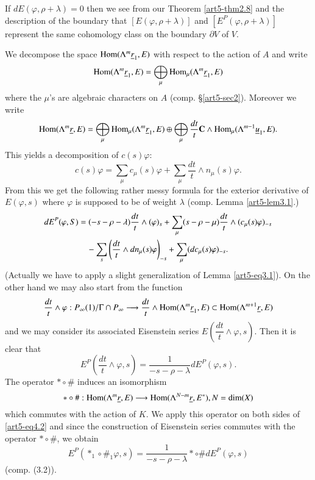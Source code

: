 If $d E (\varphi, \rho + \lambda) = 0$ then we see from our Theorem \ref{art5-thm2.8} and the description of the boundary that $[E(\varphi, \rho + \lambda)]$ and $[E^P (\varphi, \rho +\lambda)]$ represent the same cohomology class on the boundary $\partial V$ of $V$.

We decompose the space $\operatorname{Hom} (\Lambda^m \underline{r}_1, E)$ with respect to the action of $A$ and write
$$
\operatorname{Hom} (\Lambda^m \underline{r}_1, E) = \bigoplus_\mu \operatorname{Hom}_\mu (\Lambda^m \underline{r}_1, E)
$$\pageoriginale
where the $\mu$'s are algebraic characters on $A$ (comp. \S \ref{art5-sec2}). Moreover we write
$$
\operatorname{Hom} (\Lambda^m \underline{r}, E) =\bigoplus_\mu \operatorname{Hom}_\mu (\Lambda^m \underline{r}_1, E) \oplus \bigoplus_\mu \dfrac{dt}{t} \mathbf{C} \wedge \operatorname{Hom}_\mu (\Lambda^{m-1} \underline{u}_{1}, E).
$$
This yields a decomposition of $c (s) \varphi$:
$$
c (s) \varphi = \sum\limits_\mu c_\mu (s) \varphi + \sum\limits_\mu \frac{dt}{t} \wedge n_\mu (s) \varphi.
$$
From this we get the following rather messy formula for the exterior derivative of $E (\varphi, s)$ where $\varphi$ is supposed to be of weight $\lambda$ (comp. Lemma \ref{art5-lem3.1}.)
\setcounter{equation}{0}
\begin{align}
dE^P (\varphi, S) & = (-s - \rho - \lambda) \frac{dt}{t} \wedge (\varphi)_s + \sum\limits_\mu (s - \rho - \mu) \frac{dt}{t} \wedge (c_\mu (s) \varphi)_{-s} \notag\\
& \quad - \sum\limits_s \left(\frac{dt}{t} \wedge dn_\mu (s) \varphi  \right)_{-s} + \sum\limits_\mu (dc_\mu (s) \varphi)_{-s}.   \label{art5-eq4.1}
\end{align}
(Actually we have to apply a slight generalization of Lemma \ref{art5-eq3.1}). On the other hand we may also start from the function
$$
\frac{dt}{t} \wedge \varphi : P_\infty (1) / \Gamma \cap P_\infty \longrightarrow \dfrac{dt}{t} \wedge \operatorname{Hom} (\Lambda^m \underline{r}_1, E) \subset \operatorname{Hom} (\Lambda^{m+1} \underline{r}, E)
$$
and we may consider its associated Eisenstein series $E \left(\dfrac{dt}{t} \wedge \varphi, s \right)$. Then it is clear that 
\begin{equation}
E^P \left(\frac{dt}{t}  \wedge \varphi, s \right) =\frac{1}{-s-\rho - \lambda} dE^P(\varphi, s). \label{art5-eq4.2}
\end{equation}
The operator $\ast \circ \#$ induces an isomorphism
$$
\ast \circ \# : \operatorname{Hom} (\Lambda^m \underline{r}, E) \longrightarrow \operatorname{Hom} (\Lambda^{N-m} \underline{r}, E^\ast), N = \dim (X)
$$
which commutes with the action of $K$. We apply this operator on both sides of \eqref{art5-eq4.2} and since the construction of Eisenstein series commutes with the operator $\ast \circ \#$, we obtain
\begin{equation}
E^P(\ast_1 \circ \#_1 \varphi, s) = \frac{1}{-s-\rho-\lambda} \ast \circ \# d E^P (\varphi, s)
\label{art5-eq4.3}
\end{equation}
(comp. (3.2)).

